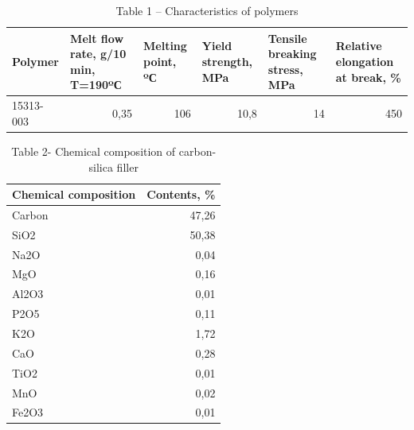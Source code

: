 \begin{table}[H]
\caption*{Table 1 -- Characteristics of polymers}
\centering
\begin{tabular}{|p{}|p{}|p{}|p{}|p{}|p{}|}
\hline
Polymer   & Melt flow rate, g/10 min, T=190ºС & Melting point, ºС        & Yield strength, MPa       & Tensile breaking stress, MPa & Relative elongation at break, \% \\ \hline
15313-003 & \multicolumn{1}{r|}{0,35}         & \multicolumn{1}{r|}{106} & \multicolumn{1}{r|}{10,8} & \multicolumn{1}{r|}{14}      & \multicolumn{1}{r|}{450}         \\ \hline
\end{tabular}
\end{table}

\begin{table}[H]
\caption*{Table 2- Chemical composition of carbon-silica filler}
\centering
\begin{tabular}{|l|r|}
\hline
\textbf{Chemical composition} & \multicolumn{1}{l|}{\textbf{Contents, \%}} \\ \hline
Carbon                        & 47,26                                      \\ \hline
SiO2                          & 50,38                                      \\ \hline
Na2O                          & 0,04                                       \\ \hline
MgO                           & 0,16                                       \\ \hline
Al2O3                         & 0,01                                       \\ \hline
P2O5                          & 0,11                                       \\ \hline
K2O                           & 1,72                                       \\ \hline
CaO                           & 0,28                                       \\ \hline
TiO2                          & 0,01                                       \\ \hline
MnO                           & 0,02                                       \\ \hline
Fe2O3                         & 0,01                                       \\ \hline
\end{tabular}
\end{table}

